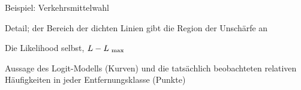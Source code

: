 





\begin{landscape}
{\vspace{-2em}\vspace{-2em}}
{\centerline{Beispiel: Verkehrsmittelwahl}}
\end{landscape}
\newpage

\begin{landscape}
{\vspace{-2em}\vspace{-2em}}
{\begin{center}Detail; der Bereich der dichten Linien gibt die Region
der Unsch\"arfe an \end{center}}
\end{landscape}
\newpage

\begin{landscape}
{\vspace{-2em}\vspace{-2em}}
{\begin{center}Die Likelihood selbst, $L-L_{{\mbox{ {\scriptsize \hspace{-0.2ex}max}}}}$ \end{center}}
\end{landscape}
\newpage

\begin{landscape}
{\vspace{-0.5em}\vspace{0em}}
{\begin{center}Aussage des Logit-Modells (Kurven) und die
tats\"achlich beobachteten relativen H\"aufigkeiten in jeder
Entfernungsklasse (Punkte)\end{center}}
\end{landscape}




